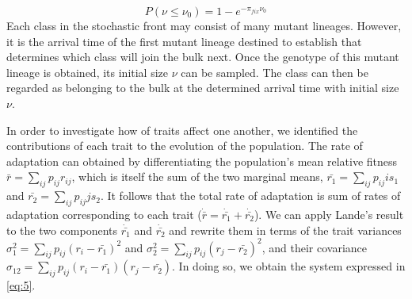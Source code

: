 \documentclass[11pt,twocolumn]{article}
\begin{document}
% 
% 
% 
% 
% 
\begin{equation} \label{eq:4}
P(\nu \leq \nu_0) = 1- e^{-\pi_{fix} \nu_0}
\end{equation}
Each class in the stochastic front may consist of many mutant lineages. However, it is the arrival time of the first mutant lineage destined to establish that determines which class will join the bulk next. Once the genotype of this mutant lineage is obtained, its initial size $\nu$ can be sampled. The class can then be regarded as belonging to the bulk at the determined arrival time with initial size $\nu$. \par
% 
% 
% 
% 
% 
In order to investigate how of traits affect one another, we identified the contributions of each trait to the evolution of the population. The rate of adaptation can obtained by differentiating the population's mean relative fitness $\bar{r}=\sum_{ij} p_{ij} r_{ij}$, which is itself the sum of the two marginal means, $\bar{r_1}=\sum_{ij} p_{ij} is_1$ and $\bar{r_2}=\sum_{ij} p_{ij} j s_2$.  It follows that the total rate of adaptation is sum of rates of adaptation corresponding to each trait ($\dot{\bar{r}}=\dot{\bar{r_1}} +\dot{\bar{r_2}}$).  We can apply Lande's result to the two components $\dot{\bar{r_1}} $ and $\dot{\bar{r_2}} $ and rewrite them in terms of the trait variances $\sigma_1^2 = \sum_{ij} p_{ij} (r_i-\bar{r_1})^2$ and $\sigma_2^2 = \sum_{ij} p_{ij} (r_j-\bar{r_2})^2$, and their covariance $\sigma_{12} =\sum_{ij} p_{ij} (r_i-\bar{r_1})(r_j-\bar{r_2})$.  In doing so, we obtain the system expressed in \eqref{eq:5}.
\end{document}

